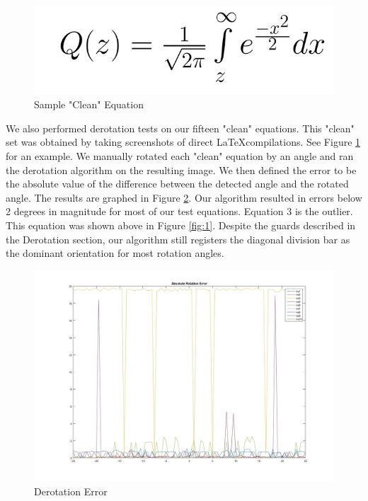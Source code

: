 \documentclass[journal]{IEEEtran}
\begin{document}
\begin{figure}[!t]
    \centering
    \includegraphics[width=\columnwidth]{clean}
    \caption{Sample "Clean" Equation}
    \label{fig:clean}
\end{figure}

We also performed derotation tests on our fifteen "clean" equations. This "clean" set was obtained by taking screenshots of direct \LaTeX compilations. See Figure \ref{fig:clean} for an example. We manually rotated each "clean" equation by an angle and ran the derotation algorithm on the resulting image. We then defined the error to be the absolute value of the difference between the detected angle and the rotated angle. The results are graphed in Figure \ref{fig:deskew_graph}. Our algorithm resulted in errors below 2 degrees in magnitude for most of our test equations. Equation 3 is the outlier. This equation was shown above in Figure \ref{fig:1}. Despite the guards described in the Derotation section, our algorithm still registers the diagonal division bar as the dominant orientation for most rotation angles.




\begin{figure}[!t]
    \centering
    \includegraphics[width=\columnwidth]{deskew_results_graph}
    \caption{Derotation Error}
    \label{fig:deskew_graph}
\end{figure}
\end{document}
